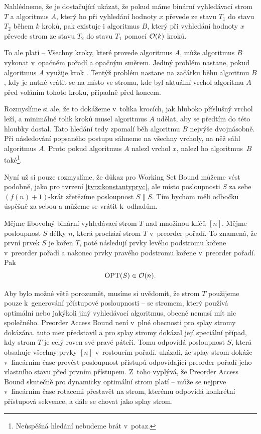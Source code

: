 \begin{dukaz}
Nahlédneme, že je dostačující ukázat, že pokud máme binární vyhledávací strom $T$ a
algoritmus $A$, který ho při vyhledání hodnoty $x$ převede ze stavu $T_1$ do stavu
$T_2$ během $k$ kroků, pak existuje i algoritmus $B$, který při vyhledání hodnoty
$x$ převede strom ze stavu $T_2$ do stavu $T_1$ pomocí $\mathcal O(k)$ kroků.

To ale platí -- Všechny kroky, které provede algoritmus $A$, může algoritmus $B$
vykonat v~opačném pořadí a opačným směrem. Jediný problém nastane, pokud
algoritmus $A$ využije krok . Tentýž problém nastane na
začátku běhu algoritmu $B$, kdy je nutné vrátit se na místo ve stromu, kde byl
aktuální vrchol algoritmu $A$ před voláním tohoto kroku, případně před koncem.

Rozmyslíme si ale, že to dokážeme v~tolika krocích, jak hluboko příslušný
vrchol leží, a minimálně tolik kroků musel algoritmus $A$ udělat, aby se předtím
do této hloubky dostal. Tato hledání tedy zpomalí běh algoritmu $B$ nejvýše
dvojnásobně. Při následování popsaného postupu sáhneme na všechny vrcholy, na něž
sáhl algoritmus $A$. Proto pokud algoritmus $A$ nalezl vrchol $x$, nalezl ho
algoritmus~$B$ také\footnote{Neúspěšná hledání nebudeme brát v~potaz.}.
\end{dukaz}

Nyní už si pouze rozmyslíme, že důkaz pro Working Set Bound můžeme vést
podobně, jako pro tvrzení \ref{tvrz:konstantypryc}, ale místo posloupnosti $S$ za sebe
$(f(n)+1)$-krát zřetězíme posloupnost $S\|\overline S$. Tím bychom měli odbočku
úspěšně za sebou a můžeme se vrátit k~odhadům. 

\begin{veta}
Mějme libovolný binární vyhledávací strom $T$ nad množinou klíčů $[n]$. Mějme posloupnost $S$ délky $n$, která prochází strom $T$ v~preorder pořadí. To znamená, že první prvek $S$ je kořen $T$, poté následují prvky levého podstromu kořene v~preorder pořadí a nakonec prvky pravého podstromu kořene v~preorder pořadí. Pak $$\operatorname{OPT}(S)\in \mathcal O(n).$$
\end{veta}

Aby bylo možné větě porozumět, musíme si uvědomit, že strom $T$ použijeme pouze
k~generování přístupové posloupnosti -- se stromem, který používá optimální nebo
jakýkoli jiný vyhledávací algoritmus, obecně nemusí mít nic společného. Preorder
Access Bound není v~plné obecnosti pro splay stromy dokázána.
\citet{preordertarjan} tuto mez představil a pro splay stromy dokázal její
speciální případ, kdy strom $T$ je celý roven své pravé páteři. Tomu odpovídá
posloupnost $S$, která obsahuje všechny prvky $[n]$ v~rostoucím pořadí.
\citet{preordersplay} ukázali, že splay strom dokáže v~lineárním čase provést
posloupnost přístupů odpovídající preorder pořadí jeho vlastního stavu před prvním
přístupem. Z~toho vyplývá, že Preorder Access Bound skutečně pro dynamicky
optimální strom platí -- může se nejprve v~lineárním čase rotacemi přestavět na strom,
kterému odpovídá konkrétní přístupová sekvence, a dále se chovat jako splay
strom. 

